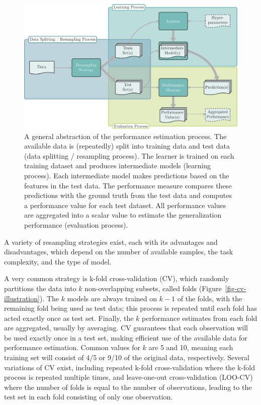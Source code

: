\begin{figure}

{\centering \includegraphics[width=1\textwidth,height=\textheight]{chapters/chapter3/Figures/mlr3book_figures-4.png}

}

\caption{\label{fig-ml-abstraction}A general abstraction of the
performance estimation process. The available data is (repeatedly) split
into training data and test data (data splitting / resampling process).
The learner is trained on each training dataset and produces
intermediate models (learning process). Each intermediate model makes
predictions based on the features in the test data. The performance
measure compares these predictions with the ground truth from the test
data and computes a performance value for each test dataset. All
performance values are aggregated into a scalar value to estimate the
generalization performance (evaluation process).}

\end{figure}

A variety of resampling strategies exist, each with its advantages and
disadvantages, which depend on the number of available samples, the task
complexity, and the type of model.

A very common strategy is k-fold
cross-validation
(CV), which randomly partitions the data into \(k\) non-overlapping
subsets, called folds (Figure~\ref{fig-cv-illustration}). The \(k\)
models are always trained on \(k-1\) of the folds, with the remaining
fold being used as test data; this process is repeated until each fold
has acted exactly once as test set. Finally, the \(k\) performance
estimates from each fold are aggregated, usually by averaging. CV
guarantees that each observation will be used exactly once in a test
set, making efficient use of the available data for performance
estimation. Common values for \(k\) are 5 and 10, meaning each training
set will consist of 4/5 or 9/10 of the original data, respectively.
Several variations of CV exist, including repeated k-fold
cross-validation where the
k-fold process is repeated multiple times, and leave-one-out
cross-validation (LOO-CV) where
the number of folds is equal to the number of observations, leading to
the test set in each fold consisting of only one observation.

